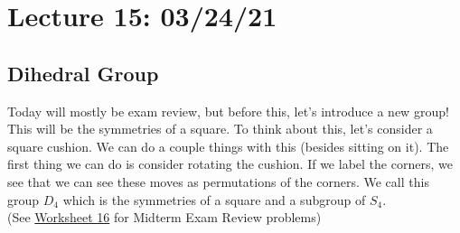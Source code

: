 \section{Lecture 15: 03/24/21}

\subsection{Dihedral Group}

Today will mostly be exam review, but before this, let's introduce a new group! This will be the symmetries of a square. 
\smallbreak
To think about this, let's consider a square cushion. We can do a couple things with this (besides sitting on it). The first thing we can do is consider rotating the cushion. If we label the corners, we see that we can see these moves as permutations of the corners. We call this group $D_4$ which is the symmetries of a square and a subgroup of $S_4$.\\

(See \href{https://canvas.harvard.edu/courses/79110/files/12034681}{Worksheet 16} for Midterm Exam Review problems)